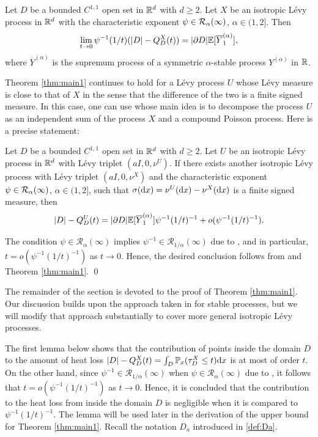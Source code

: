\documentclass[11pt]{article}
\begin{document}
\begin{doublespace}
\begin{thm}\label{thm:main1}
Let $D$ be a bounded $C^{1,1}$ open set in ${\mathbb R}^{d}$ with $d\ge 2$.
Let $X$ be an isotropic L\'evy process in ${\mathbb R}^d$ with the characteristic exponent $\psi\in {\mathcal R}_{\alpha}(\infty)$, $\alpha\in (1,2]$. 
Then 
\[
\lim_{t\to0}\psi^{-1}(1/t)(|D|-Q_{D}^{X}(t))=|\partial D|{\mathbb E}[\overline{Y}^{(\alpha)}_{1}],
\]
where $\overline{Y}^{(\alpha)}$ is the supremum process of a symmetric $\alpha$-stable process $Y^{(\alpha)}$ in ${\mathbb R}$.
\end{thm}



Theorem \ref{thm:main1} continues to hold for a L\'evy process $U$ whose L\'evy measure is close to that of $X$ in the sense that the difference of the two is a finite signed measure.
In this case, one can use \cite[Theorem 5.1]{GPS19} whose main idea is to decompose the process $U$ as an independent sum of the process $X$ and a compound Poisson process. Here is a precise statement:
\begin{corollary}\label{cor:main}
Let $D$ be a bounded $C^{1,1}$ open set in ${\mathbb R}^{d}$ with $d\ge 2$.
Let $U$ be an isotropic L\'evy process in ${\mathbb R}^d$ with L\'evy triplet $(aI,0,\nu^{U})$. If there exists another isotropic L\'evy process with L\'evy triplet $(aI,0,\nu^X)$ and the characteristic exponent $\psi\in{\mathcal R}_{\alpha}(\infty)$, $\alpha\in (1,2]$, such that $\sigma(\mathrm{d} x)=\nu^U(\mathrm{d} x)-\nu^X(\mathrm{d} x)$ is a finite signed measure, then 
\[
|D|-Q_{D}^{U}(t)=
|\partial D|{\mathbb E}[\overline{Y}^{(\alpha)}_{1}]\psi^{-1}(1/t)^{-1} + o(\psi^{-1}(1/t)^{-1}).
\]
\end{corollary}
\pf
The condition $\psi\in \mathcal{R}_{\alpha}(\infty)$  implies $\psi^{-1}\in \mathcal{R}_{1/\alpha}(\infty)$ due to \cite[Theorems 1.5.3 and 1.5.12]{BGT}, and in particular,  
$t=o(\psi^{-1}(1/t)^{-1})$ as $t\to 0$.
Hence, the desired conclusion follows from \cite[Theorem 5.1]{GPS19} and Theorem \ref{thm:main1}.
\qed



The remainder of the section is devoted to the proof of Theorem \ref{thm:main1}. 
Our discussion builds upon the approach taken in \cite{PS22} for stable processes, but we will modify that approach substantially to cover more general isotropic L\'evy processes.



The first lemma below shows that the contribution of points inside the domain $D$ to the amount of heat loss $|D|-Q_{D}^{X}(t)=\int_D {\mathbb P}_x(\tau_{D}^{X}\leq t)\mathrm{d} x$ is at most of order $t$. 
On the other hand, since $\psi^{-1}\in \mathcal{R}_{1/\alpha}(\infty)$ when $\psi\in \mathcal{R}_{\alpha}(\infty)$ due to \cite[Theorems 1.5.3 and 1.5.12]{BGT}, it follows that 
$t=o(\psi^{-1}(1/t)^{-1})$ 
as $t\to 0$. 
Hence, it is concluded that the contribution to the heat loss from inside the domain $D$ is negligible when it is compared to $\psi^{-1}(1/t)^{-1}$. The lemma will be used later in the derivation of the upper bound for Theorem \ref{thm:main1}. 
Recall the notation $D_a$ introduced in \eqref{def:Da}.


\end{doublespace}
\end{document}
